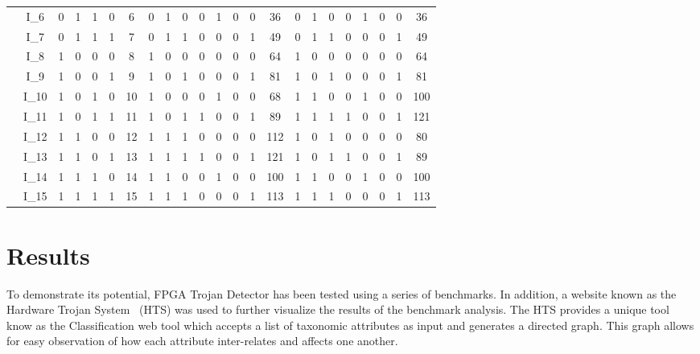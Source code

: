 \documentclass[journal, hidelinks]{IEEEtran}
\begin{document}
\begin{table}[t!]
\begin{tabular}{CC|C|C|C|C|C||C|C|C|C|C|C|C|C||C|C|C|C|C|C|C|C|}
		 & I_6 & 0 & 1 & 1 & 0 & 6 & 0 & 1 & 0 & 0 & 1 & 0 & 0 & 36 & 0 & 1 & 0 & 0 & 1 & 0 & 0 & 36 \\ 
		 & I_7 & 0 & 1 & 1 & 1 & 7 & 0 & 1 & 1 & 0 & 0 & 0 & 1 & 49 & 0 & 1 & 1 & 0 & 0 & 0 & 1 & 49 \\ 
		 & I_8 & 1 & 0 & 0 & 0 & 8 & 1 & 0 & 0 & 0 & 0 & 0 & 0 & 64 & 1 & 0 & 0 & 0 & 0 & 0 & 0 & 64 \\ 
		 & I_9 & 1 & 0 & 0 & 1 & 9 & 1 & 0 & 1 & 0 & 0 & 0 & 1 & 81 & 1 & 0 & 1 & 0 & 0 & 0 & 1 & 81 \\ \hline
		 & I_{10} & 1 & 0 & 1 & 0 & 10 & 1 & 0 & 0 & 0 & 1 & 0 & 0 & 68 & 1 & 1 & 0 & 0 & 1 & 0 & 0 & 100 \\ 
		 & I_{11} & 1 & 0 & 1 & 1 & 11 & 1 & 0 & 1 & 1 & 0 & 0 & 1 & 89 & 1 & 1 & 1 & 1 & 0 & 0 & 1 & 121 \\ 
		 & I_{12} & 1 & 1 & 0 & 0 & 12 & 1 & 1 & 1 & 0 & 0 & 0 & 0 & 112 & 1 & 0 & 1 & 0 & 0 & 0 & 0 & 80 \\ 
		 & I_{13} & 1 & 1 & 0 & 1 & 13 & 1 & 1 & 1 & 1 & 0 & 0 & 1 & 121 & 1 & 0 & 1 & 1 & 0 & 0 & 1 & 89 \\ 
		 & I_{14} & 1 & 1 & 1 & 0 & 14 & 1 & 1 & 0 & 0 & 1 & 0 & 0 & 100 & 1 & 1 & 0 & 0 & 1 & 0 & 0 & 100 \\ 
		 & I_{15} & 1 & 1 & 1 & 1 & 15 & 1 & 1 & 1 & 0 & 0 & 0 & 1 & 113 & 1 & 1 & 1 & 0 & 0 & 0 & 1 & 113 \\ \hline
	\end{tabular}
\end{table}
\section{Results} \label{sec:results}
To demonstrate its potential, FPGA Trojan Detector has been tested using a series of benchmarks.
In addition, a website known as the Hardware Trojan System~\cite{meCategorization} (HTS) was used to further visualize the results of the benchmark analysis.
The HTS provides a unique tool know as the Classification web tool which accepts a list of taxonomic attributes as input and generates a directed graph.
This graph allows for easy observation of how each attribute inter-relates and affects one another.
\end{document}
